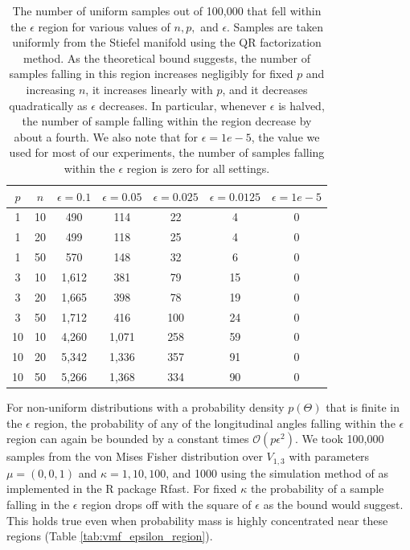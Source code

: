 \documentclass[ba]{imsart}
\numberwithin{equation}{section}
\theoremstyle{plain}
\begin{document}
\begin{table}
\begin{tabular}{|cc||ccccc|}
\hline
$p$ & $n$  & $\epsilon = 0.1$ & $\epsilon = 0.05$ & $\epsilon = 0.025$ & $\epsilon = 0.0125$ & $\epsilon = 1e-5$\\
\hline
\hline
1 & 10 & 490 & 114 & 22 & 4 & 0\\
1 & 20 & 499 & 118 & 25 & 4 & 0\\
1 & 50 & 570 & 148 & 32 & 6 & 0 \\
\hline
3 & 10 & 1,612 & 381 & 79  & 15 & 0\\
3 & 20 & 1,665 & 398 & 78 & 19 & 0\\
3 & 50 & 1,712 & 416 & 100  & 24 & 0\\
\hline
10 & 10 & 4,260 & 1,071 & 258 & 59 & 0\\
10 & 20 & 5,342 & 1,336 & 357 & 91 & 0\\
10 & 50 & 5,266 & 1,368 & 334 & 90 & 0 \\
\hline
\end{tabular}
\caption{The number of uniform samples out of 100,000 that fell within the $\epsilon$ region for various values of $n, p,$ and $\epsilon$. Samples are taken uniformly from the Stiefel manifold using the QR factorization method. As the theoretical bound suggests, the number of samples falling in this region increases negligibly for fixed $p$ and increasing $n$, it increases linearly with $p$, and it decreases quadratically as $\epsilon$ decreases. In particular, whenever $\epsilon$ is halved, the number of sample falling within the region decrease by about a fourth. We also note that for $\epsilon = 1e-5$, the value we used for most of our experiments, the number of samples falling within the $\epsilon$ region is zero for all settings.}
\label{tab:uniform_epsilon_region}
\end{table}

\noindent For non-uniform distributions with a probability density $p(\Theta)$ that is finite in the $\epsilon$ region, the probability of any of the longitudinal angles falling within the $\epsilon$ region can again be bounded by a constant times $\mathcal{O}(p \epsilon^2)$. We took 100,000 samples from the von Mises Fisher distribution over $V_{1,3}$ with parameters $\mu = (0,0,1)$ and $\kappa = 1, 10, 100$, and 1000 using the simulation method of \citet{wood1994simulation} as implemented in the R package Rfast. For fixed $\kappa$ the probability of a sample falling in the $\epsilon$ region drops off with the square of $\epsilon$ as the bound would suggest. This holds true even when probability mass is highly concentrated near these regions (Table \ref{tab:vmf_epsilon_region}).  
\end{document}
